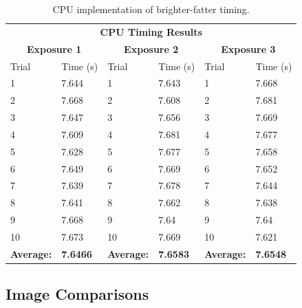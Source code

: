 \documentclass[DM,authoryear,toc]{lsstdoc}
\begin{document}
\begin{table}[h]
\begin{center}
\begin{tabular}{|p{45pt}|p{45pt}|p{45pt}|p{45pt}|p{45pt}|p{45pt}|}
\multicolumn{6}{c}{\textbf{CPU Timing Results}}\\
\multicolumn{2}{c}{\textbf{Exposure 1}} & \multicolumn{2}{c}{\textbf{Exposure 2}} &\multicolumn{2}{c}{\textbf{Exposure 3}}\\ 
\hline
Trial & Time (s) & Trial & Time (s) & Trial & Time (s)\\
\hline
1 & 7.644 & 1 & 7.643 & 1 & 7.668\\
\hline
2 & 7.668 & 2 & 7.608 & 2 & 7.681\\
\hline
3 & 7.647 & 3 & 7.656 & 3 & 7.669\\
\hline
4 & 7.609 & 4 & 7.681 & 4 & 7.677\\
\hline
5 & 7.628 & 5 & 7.677 & 5 & 7.658\\
\hline
6 & 7.649 & 6 & 7.669 & 6 & 7.652\\
\hline
7 & 7.639 & 7 & 7.678 & 7 & 7.644\\
\hline
8 & 7.641 & 8 & 7.662 & 8 & 7.638\\
\hline
9 & 7.668 & 9 & 7.64 & 9 & 7.64\\
\hline
10 & 7.673 & 10 & 7.669 & 10 & 7.621\\
\hline
\textbf{Average:} & \textbf{7.6466} & \textbf{Average:} & \textbf{7.6583} & \textbf{Average:} & \textbf{7.6548}\\
\hline
\end{tabular}
\caption{\label{tab:cputimes}CPU implementation of brighter-fatter timing.}
\end{center}
\end{table}

\FloatBarrier

\clearpage
\subsection{Image Comparisons}
\end{document}
